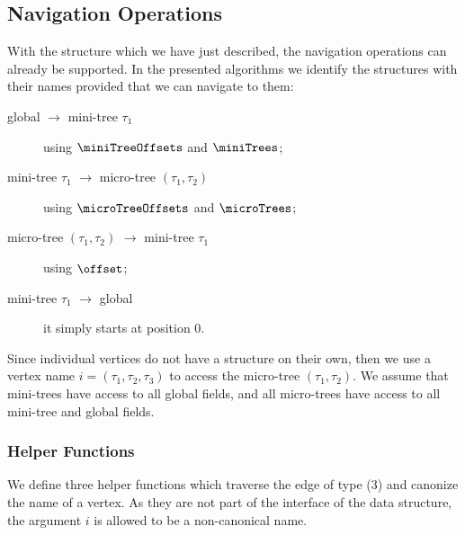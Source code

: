 \subsection{Navigation Operations}

With the structure which we have just described, the navigation operations can already be supported.
In the presented algorithms we identify the structures with their names provided that we can navigate to them:
\begin{description}
	\item[global $\to$ mini-tree $\tau_1$] using $\miniTreeOffsets$ and $\miniTrees$;
	\item[mini-tree $\tau_1$ $\to$ micro-tree $(\tau_1, \tau_2)$] using $\microTreeOffsets$ and $\microTrees$;
	\item[micro-tree $(\tau_1, \tau_2)$ $\to$ mini-tree $\tau_1$] using $\offset$;
	\item[mini-tree $\tau_1$ $\to$ global] it simply starts at position $0$.
\end{description}

Since individual vertices do not have a structure on their own, then we use a vertex name $i = (\tau_1, \tau_2, \tau_3)$ to access the micro-tree $(\tau_1, \tau_2)$.
We assume that mini-trees have access to all global fields, and all micro-trees have access to all mini-tree and global fields.

\subsubsection{Helper Functions}

We define three helper functions which traverse the edge of type (3) and canonize the name of a vertex.
As they are not part of the interface of the data structure, the argument $i$ is allowed to be a non-canonical name.

\begin{algorithm}
\begin{algorithmic}
	 
		 
			\State {}
		\Else {}
			\State {}
		\EndIf
	\Else {}
		\State {}
	\EndIf
\EndFunction
\end{algorithmic}
\end{algorithm}


